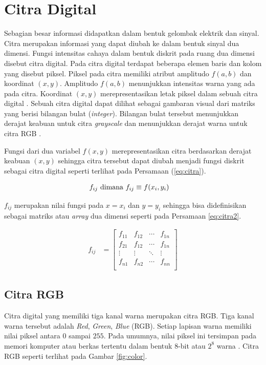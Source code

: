 \section{Citra Digital}
Sebagian besar informasi didapatkan dalam bentuk gelombak elektrik dan sinyal. Citra merupakan informasi yang dapat diubah ke dalam bentuk sinyal dua dimensi. Fungsi intensitas cahaya dalam bentuk diskrit pada ruang dua dimensi disebut citra digital. Pada citra digital terdapat beberapa elemen baris dan kolom yang disebut piksel. Piksel pada citra memiliki atribut amplitudo $f(a,b)$ dan koordinat $(x,y)$. Amplitudo $f(a,b)$ menunjukkan intensitas warna yang ada pada citra. Koordinat $(x,y)$ merepresentasikan letak piksel dalam sebuah citra digital \citep{Ratna2020}. Sebuah citra digital dapat dilihat sebagai gambaran visual dari matriks yang berisi bilangan bulat (\textit{integer}). Bilangan bulat tersebut menunjukkan derajat keabuan untuk citra \textit{grayscale} dan menunjukkan derajat warna untuk citra RGB \citep{Blackledge2005,Septiaji2018}.

Fungsi dari dua variabel $f(x,y)$ merepresentasikan citra berdasarkan derajat keabuan $(x,y)$ sehingga citra tersebut dapat diubah menjadi fungsi diskrit sebagai citra digital seperti terlihat pada Persamaan (\ref{eq:citra}).

\begin{align}
    f_{ij} \textnormal{ dimana } f_{ij} &\equiv f(x_i, y_i)
    \label{eq:citra}
\end{align}

$f_{ij}$ merupakan nilai fungsi pada $x=x_i$ dan $y=y_i$ sehingga bisa didefinisikan sebagai matriks atau \textit{array} dua dimensi seperti pada Persamaan \ref{eq:citra2}.

\begin{align}
    f_{ij} &=
    \begin{bmatrix}
        f_{11} &f_{12} &\cdots &f_{1n}\\
        f_{21} &f_{12} &\cdots &f_{1n}\\
        \vdots &\vdots &\ddots &\vdots\\
        f_{n1} &f_{n2} &\cdots &f_{nn}\\
    \end{bmatrix}
    \label{eq:citra2}
\end{align}

    \subsection{Citra RGB}
    Citra digital yang memiliki tiga kanal warna merupakan citra RGB. Tiga kanal warna tersebut adalah \textit{Red}, \textit{Green}, \textit{Blue} (RGB). Setiap lapisan warna memiliki nilai piksel antara $0$ sampai $255$. Pada umumnya, nilai piksel ini tersimpan pada memori komputer atau berkas tertentu dalam bentuk 8-bit atau $2^8$ warna \citep{Septiaji2018}. Citra RGB seperti terlihat pada Gambar \ref{fig:color}.

